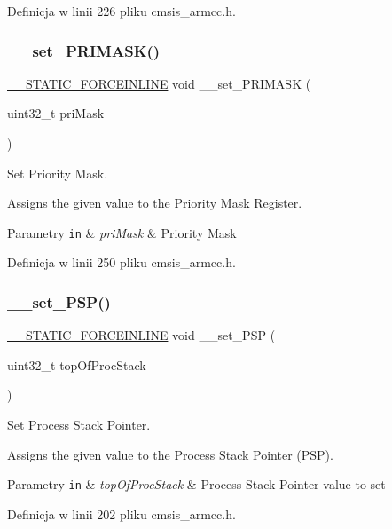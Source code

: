 Definicja w linii 226 pliku cmsis\+\_\+armcc.\+h.

\mbox{\label{group___c_m_s_i_s___core___reg_acc_functions_gaf4a17d3be7dbb066489836d849930d92}} 
\subsubsection{\texorpdfstring{\+\_\+\+\_\+set\+\_\+\+P\+R\+I\+M\+A\+S\+K()}{\_\_set\_PRIMASK()}}
{\footnotesize\ttfamily \hyperlink{cmsis__iccarm_8h_ab904513442afdf77d4f8c74f23cbb040}{\+\_\+\+\_\+\+S\+T\+A\+T\+I\+C\+\_\+\+F\+O\+R\+C\+E\+I\+N\+L\+I\+NE} void \+\_\+\+\_\+set\+\_\+\+P\+R\+I\+M\+A\+SK (\begin{DoxyParamCaption}\item[{uint32\+\_\+t}]{pri\+Mask }\end{DoxyParamCaption})}



Set Priority Mask. 

Assigns the given value to the Priority Mask Register. 
\begin{DoxyParams}[1]{Parametry}
\mbox{\tt in}  & {\em pri\+Mask} & Priority Mask \\
\hline
\end{DoxyParams}


Definicja w linii 250 pliku cmsis\+\_\+armcc.\+h.

\mbox{\label{group___c_m_s_i_s___core___reg_acc_functions_ga21f50fc02c3927a8ebf0bc3678c06862}} 
\subsubsection{\texorpdfstring{\+\_\+\+\_\+set\+\_\+\+P\+S\+P()}{\_\_set\_PSP()}}
{\footnotesize\ttfamily \hyperlink{cmsis__iccarm_8h_ab904513442afdf77d4f8c74f23cbb040}{\+\_\+\+\_\+\+S\+T\+A\+T\+I\+C\+\_\+\+F\+O\+R\+C\+E\+I\+N\+L\+I\+NE} void \+\_\+\+\_\+set\+\_\+\+P\+SP (\begin{DoxyParamCaption}\item[{uint32\+\_\+t}]{top\+Of\+Proc\+Stack }\end{DoxyParamCaption})}



Set Process Stack Pointer. 

Assigns the given value to the Process Stack Pointer (P\+SP). 
\begin{DoxyParams}[1]{Parametry}
\mbox{\tt in}  & {\em top\+Of\+Proc\+Stack} & Process Stack Pointer value to set \\
\hline
\end{DoxyParams}


Definicja w linii 202 pliku cmsis\+\_\+armcc.\+h.

